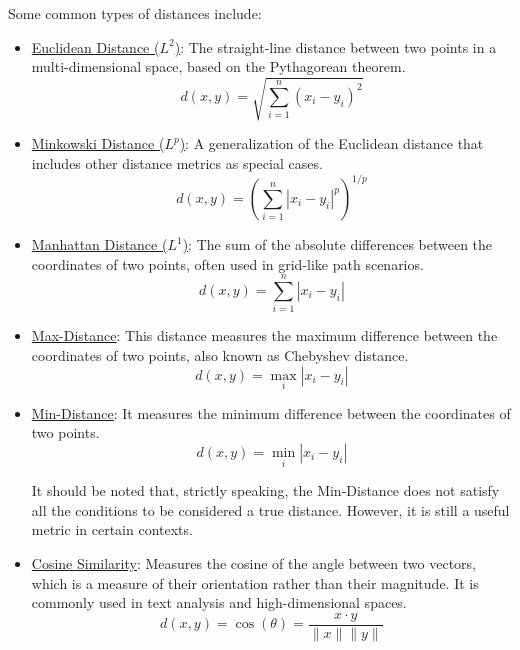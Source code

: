 Some common types of distances include:
\begin{itemize}
    \item \ul{Euclidean Distance ($L^2$)}: The straight-line distance between two points in a multi-dimensional space, based on the Pythagorean theorem.
    \begin{equation*}
        d(x, y) = \sqrt{\sum_{i=1}^{n} (x_i - y_i)^2}
    \end{equation*}

    \item \ul{Minkowski Distance ($L^p$)}: A generalization of the Euclidean distance that includes other distance metrics as special cases.
    \begin{equation*}
        d(x, y) = \left( \sum_{i=1}^{n} |x_i - y_i|^p \right)^{1/p}
    \end{equation*}

    \item \ul{Manhattan Distance ($L^1$)}: The sum of the absolute differences between the coordinates of two points, often used in grid-like path scenarios.
    \begin{equation*}
        d(x, y) = \sum_{i=1}^{n} |x_i - y_i|
    \end{equation*}

    \item \ul{Max-Distance}: This distance measures the maximum difference between the coordinates of two points, also known as Chebyshev distance.
    \begin{equation*}
        d(x, y) = \max_{i} |x_i - y_i|
    \end{equation*}

    \item \ul{Min-Distance}: It measures the minimum difference between the coordinates of two points.
    \begin{equation*}
        d(x, y) = \min_{i} |x_i - y_i|
    \end{equation*}

    It should be noted that, strictly speaking, the Min-Distance does not satisfy all the conditions to be considered a true distance. However, it is still a useful metric in certain contexts.

    \item \ul{Cosine Similarity}: Measures the cosine of the angle between two vectors, which is a measure of their orientation rather than their magnitude. It is commonly used in text analysis and high-dimensional spaces.
    \begin{equation*}
        d(x, y) = \cos(\theta) = \frac{x \cdot y}{\|x\| \|y\|}
    \end{equation*}
\end{itemize}

